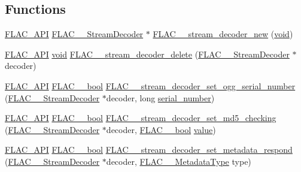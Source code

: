 \subsection*{Functions}
\begin{DoxyCompactItemize}
\item 
\hyperlink{group__flac__export_ga56ca07df8a23310707732b1c0007d6f5}{F\+L\+A\+C\+\_\+\+A\+PI} \hyperlink{struct_f_l_a_c_____stream_decoder}{F\+L\+A\+C\+\_\+\+\_\+\+Stream\+Decoder} $\ast$ \hyperlink{group__flac__stream__decoder_ga7159eefc074dfbab4a37462f69326091}{F\+L\+A\+C\+\_\+\+\_\+stream\+\_\+decoder\+\_\+new} (\hyperlink{sound_8c_ae35f5844602719cf66324f4de2a658b3}{void})
\item 
\hyperlink{group__flac__export_ga56ca07df8a23310707732b1c0007d6f5}{F\+L\+A\+C\+\_\+\+A\+PI} \hyperlink{sound_8c_ae35f5844602719cf66324f4de2a658b3}{void} \hyperlink{group__flac__stream__decoder_gab958ee28b829be37e541946676ad9677}{F\+L\+A\+C\+\_\+\+\_\+stream\+\_\+decoder\+\_\+delete} (\hyperlink{struct_f_l_a_c_____stream_decoder}{F\+L\+A\+C\+\_\+\+\_\+\+Stream\+Decoder} $\ast$decoder)
\item 
\hyperlink{group__flac__export_ga56ca07df8a23310707732b1c0007d6f5}{F\+L\+A\+C\+\_\+\+A\+PI} \hyperlink{ordinals_8h_a95103469f1cbd78b8cf250194985b34e}{F\+L\+A\+C\+\_\+\+\_\+bool} \hyperlink{group__flac__stream__decoder_ga7bb4d567a4a07c911a895b9cef7551d9}{F\+L\+A\+C\+\_\+\+\_\+stream\+\_\+decoder\+\_\+set\+\_\+ogg\+\_\+serial\+\_\+number} (\hyperlink{struct_f_l_a_c_____stream_decoder}{F\+L\+A\+C\+\_\+\+\_\+\+Stream\+Decoder} $\ast$decoder, long \hyperlink{src_2flac_2main_8c_ad4fa58c4df2ce0ee8892547f07ac9bc9}{serial\+\_\+number})
\item 
\hyperlink{group__flac__export_ga56ca07df8a23310707732b1c0007d6f5}{F\+L\+A\+C\+\_\+\+A\+PI} \hyperlink{ordinals_8h_a95103469f1cbd78b8cf250194985b34e}{F\+L\+A\+C\+\_\+\+\_\+bool} \hyperlink{group__flac__stream__decoder_ga48074d18a17ea88e8272cc8f865ae6e6}{F\+L\+A\+C\+\_\+\+\_\+stream\+\_\+decoder\+\_\+set\+\_\+md5\+\_\+checking} (\hyperlink{struct_f_l_a_c_____stream_decoder}{F\+L\+A\+C\+\_\+\+\_\+\+Stream\+Decoder} $\ast$decoder, \hyperlink{ordinals_8h_a95103469f1cbd78b8cf250194985b34e}{F\+L\+A\+C\+\_\+\+\_\+bool} \hyperlink{lib_2expat_8h_a4a30a13b813682e68c5b689b45c65971}{value})
\item 
\hyperlink{group__flac__export_ga56ca07df8a23310707732b1c0007d6f5}{F\+L\+A\+C\+\_\+\+A\+PI} \hyperlink{ordinals_8h_a95103469f1cbd78b8cf250194985b34e}{F\+L\+A\+C\+\_\+\+\_\+bool} \hyperlink{group__flac__stream__decoder_ga1644555cae7c54215c39bb4971100728}{F\+L\+A\+C\+\_\+\+\_\+stream\+\_\+decoder\+\_\+set\+\_\+metadata\+\_\+respond} (\hyperlink{struct_f_l_a_c_____stream_decoder}{F\+L\+A\+C\+\_\+\+\_\+\+Stream\+Decoder} $\ast$decoder, \hyperlink{group__flac__format_gac71714ba8ddbbd66d26bb78a427fac01}{F\+L\+A\+C\+\_\+\+\_\+\+Metadata\+Type} type)

\end{DoxyCompactItemize}

